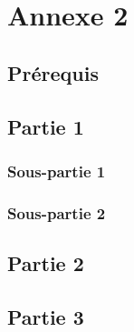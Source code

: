 \section{Annexe 2}
\label{sec:annexe2}
\subsection{Prérequis}
\label{ssec:annexe2_prerequis}
\subsection{Partie 1}
\label{ssec:annexe2_partie1}
\subsubsection{Sous-partie 1}
\label{sssec:annexe2_partie1_sous1}
\subsubsection{Sous-partie 2}
\label{sssec:annexe2_partie1_sous2}
\subsection{Partie 2}
\label{ssec:annexe2_partie2}
\subsection{Partie 3}
\label{ssec:annexe2_partie3}
